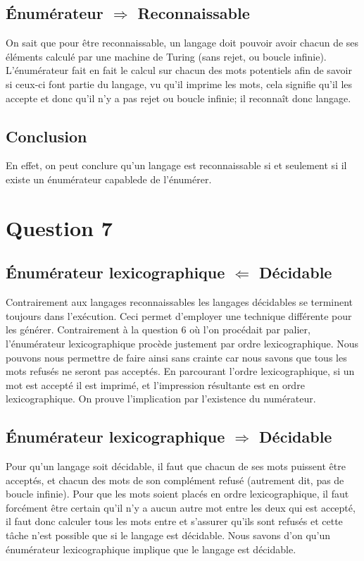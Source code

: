 \documentclass{article}
\begin{document}
\subsection{Énumérateur $\Rightarrow$ Reconnaissable}
On sait que pour être reconnaissable, un langage doit pouvoir avoir chacun de ses éléments calculé par une machine de Turing (sans rejet, ou boucle infinie). L'énumérateur fait en fait le calcul sur chacun des mots potentiels afin de savoir si ceux-ci font partie du langage, vu qu'il imprime les mots, cela signifie qu'il les accepte et donc qu'il n'y a pas rejet ou boucle infinie; il reconnaît donc langage.
\subsection{Conclusion}
En effet, on peut conclure qu’un langage est reconnaissable si et seulement si il existe un énumérateur capablede de l'énumérer.

\section{Question 7}
\subsection{Énumérateur lexicographique $\Leftarrow$ Décidable}
Contrairement aux langages reconnaissables les langages décidables se terminent toujours dans l'exécution. Ceci permet d'employer une technique différente pour les générer. Contrairement à la question 6 où l'on procédait par palier, l'énumérateur lexicographique procède justement par ordre lexicographique. Nous pouvons nous permettre de faire ainsi sans crainte car nous savons que tous les mots refusés ne seront pas acceptés. En parcourant l'ordre lexicographique, si un mot est accepté il est imprimé, et l'impression résultante est en ordre lexicographique. On prouve l'implication par l'existence du numérateur.
\subsection{Énumérateur lexicographique $\Rightarrow$ Décidable}
Pour qu'un langage soit décidable, il faut que chacun de ses mots puissent être acceptés, et chacun des mots de son complément refusé (autrement dit, pas de boucle infinie). Pour que les mots soient placés en ordre lexicographique, il faut forcément être certain qu'il n'y a aucun autre mot entre les deux qui est accepté, il faut donc calculer tous les mots entre et s'assurer qu'ils sont refusés et cette tâche n'est possible que si le langage est décidable. Nous savons d'on qu'un énumérateur lexicographique implique que le langage est décidable.
\end{document}
